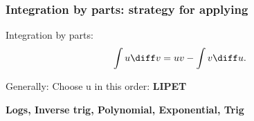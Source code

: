 \begin{frame}
\frametitle{Integration by parts: strategy for applying}
Integration by parts:
\belowdisplayskip=0pt
\abovedisplayskip=0pt
\[
\int u\diff v = uv - \int v\diff u.
\]

\begin{center}
Generally: Choose u in this order: {\Large \textbf{  LIPET}}
\end{center}
\pause

\begin{center}
{\Large \textbf{  Logs, Inverse trig, Polynomial, Exponential, Trig
}}
\end{center}
\end{frame}